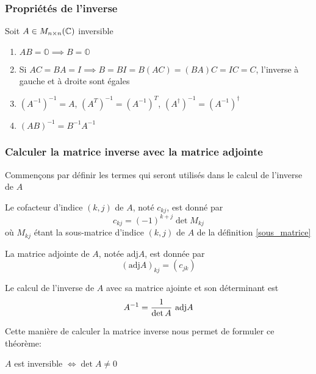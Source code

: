 \subsubsection{Propriétés de l'inverse}
Soit $A \in M_{n \times n}(\mathbb{C})$ inversible \begin{enumerate}
    \item $AB = \mathbb{O} \implies B = \mathbb{O}$
    \item Si $AC = BA = I \implies B = BI = B(AC) = (BA)C = IC = C $, l'inverse à gauche et à droite sont égales
    \item $(A^{-1})^{-1} = A$, \quad $(A^T)^{-1} = (A^{-1})^{T}$, \quad $(A^\dagger)^{-1} = (A^{-1})^{\dagger}$
    \item $(AB)^{-1} = B^{-1}A^{-1}$
\end{enumerate}

\subsubsection{Calculer la matrice inverse avec la matrice adjointe}
Commençons par définir les termes qui seront utilisés dans le calcul de l'inverse de $A$
\begin{definition}
    Le cofacteur d'indice $(k, j)$ de $A$, noté $c_{kj}$, est donné par
    \[ c_{kj} = (-1)^{k + j}\det M_{kj} \]
    où $M_{kj}$ étant la sous-matrice d'indice $(k, j)$ de $A$ de la définition \ref{sous_matrice}
\end{definition}
\begin{definition}
    La matrice adjointe de $A$, notée $\text{adj} A$, est donnée par
    \[ \left(\text{adj} A\right)_{kj} = \left( c_{jk} \right) \]
\end{definition}
\begin{theorem}
    Le calcul de l'inverse de $A$ avec sa matrice ajointe et son déterminant est
    \[ A^{-1} = \frac{1}{\det A} \ \textup{adj}A \]
\end{theorem}
Cette manière de calculer la matrice inverse nous permet de formuler ce théorème:
\begin{theorem}
    \label{inversible_small}
    $A$ est inversible $\iff \det A \neq 0$
\end{theorem}

